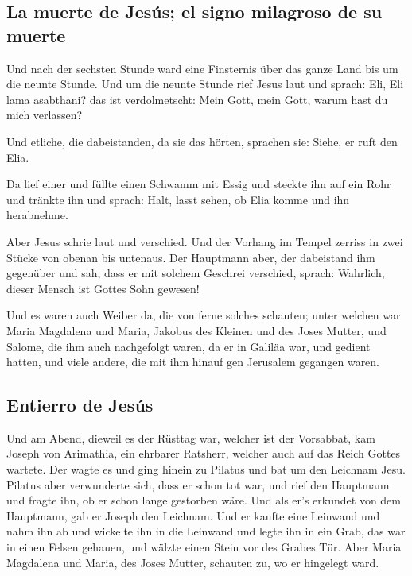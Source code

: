 \hypertarget{la-muerte-de-jesuxfas-el-signo-milagroso-de-su-muerte}{%
\subsection{La muerte de Jesús; el signo milagroso de su
muerte}\label{la-muerte-de-jesuxfas-el-signo-milagroso-de-su-muerte}}

 Und nach der sechsten Stunde ward eine Finsternis über
das ganze Land bis um die neunte Stunde.  Und um die
neunte Stunde rief Jesus laut und sprach: Eli, Eli lama asabthani? das
ist verdolmetscht: Mein Gott, mein Gott, warum hast du mich verlassen?

 Und etliche, die dabeistanden, da sie das hörten,
sprachen sie: Siehe, er ruft den Elia.

 Da lief einer und füllte einen Schwamm mit Essig und
steckte ihn auf ein Rohr und tränkte ihn und sprach: Halt, lasst sehen,
ob Elia komme und ihn herabnehme.

 Aber Jesus schrie laut und verschied. 
Und der Vorhang im Tempel zerriss in zwei Stücke von obenan bis
untenaus.  Der Hauptmann aber, der dabeistand ihm
gegenüber und sah, dass er mit solchem Geschrei verschied, sprach:
Wahrlich, dieser Mensch ist Gottes Sohn gewesen!

 Und es waren auch Weiber da, die von ferne solches
schauten; unter welchen war Maria Magdalena und Maria, Jakobus des
Kleinen und des Joses Mutter, und Salome,  die ihm auch
nachgefolgt waren, da er in Galiläa war, und gedient hatten, und viele
andere, die mit ihm hinauf gen Jerusalem gegangen waren.

\hypertarget{entierro-de-jesuxfas}{%
\subsection{Entierro de Jesús}\label{entierro-de-jesuxfas}}

 Und am Abend, dieweil es der Rüsttag war, welcher ist
der Vorsabbat,  kam Joseph von Arimathia, ein ehrbarer
Ratsherr, welcher auch auf das Reich Gottes wartete. Der wagte es und
ging hinein zu Pilatus und bat um den Leichnam Jesu. 
Pilatus aber verwunderte sich, dass er schon tot war, und rief den
Hauptmann und fragte ihn, ob er schon lange gestorben wäre.
 Und als er's erkundet von dem Hauptmann, gab er Joseph
den Leichnam.  Und er kaufte eine Leinwand und nahm ihn
ab und wickelte ihn in die Leinwand und legte ihn in ein Grab, das war
in einen Felsen gehauen, und wälzte einen Stein vor des Grabes Tür.
 Aber Maria Magdalena und Maria, des Joses Mutter,
schauten zu, wo er hingelegt ward.

